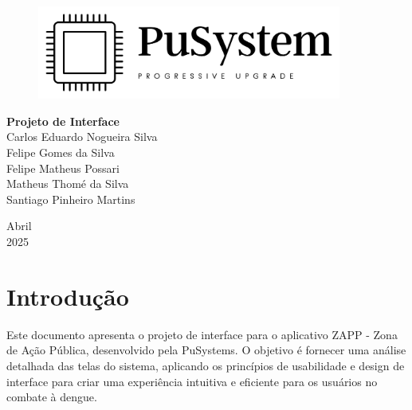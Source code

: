 \documentclass[a4paper, 12pt]{article}
\begin{document}
\begin{titlepage}
	\begin{center}
	
	\begin{figure}[!ht]
	\centering
	  \includegraphics[width=10cm]{dist/LogoTransparentePreto.png} \\ 
    \end{figure}

	\vspace{115pt}
    \textbf{\Huge{Projeto de Interface}}\\
        
	\vspace{115pt}
    Carlos Eduardo Nogueira Silva \\
    Felipe Gomes da Silva \\
    Felipe Matheus Possari \\
    Matheus Thomé da Silva\\ 
    Santiago Pinheiro Martins \\
	\end{center}
	
	\vspace{1cm}
	\begin{center}
		\vspace{\fill}
		Abril \\
		2025
	\end{center}
\end{titlepage}

\newpage
\thispagestyle{empty}
\tableofcontents

\newpage
\pagestyle{fancy}
\fancyhead[L]{\thepage}
\fancyhead[C]{\nouppercase{\leftmark}}
\fancyfoot[R]{}
\fancyfoot[L]{}
\setlength\headheight{26pt}

\section{Introdução}
Este documento apresenta o projeto de interface para o aplicativo ZAPP - Zona de Ação Pública, desenvolvido pela PuSystems. O objetivo é fornecer uma análise detalhada das telas do sistema, aplicando os princípios de usabilidade e design de interface para criar uma experiência intuitiva e eficiente para os usuários no combate à dengue.
\end{document}
